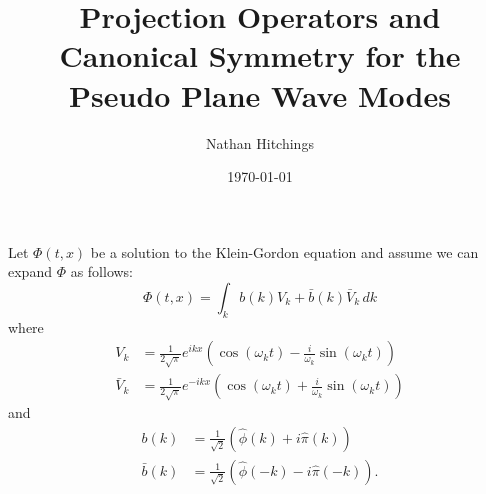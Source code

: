 \documentclass[12pt,oneside]{article}
\title{Projection Operators and Canonical Symmetry for the Pseudo Plane Wave Modes}
\date{\today}
\author{Nathan Hitchings}
\begin{document}
\maketitle
Let $\Phi(t,x)$ be a solution to the Klein-Gordon equation and assume
we can expand $\Phi$ as follows:
\begin{equation}
  \Phi(t,x)=\int_kb(k)V_k+\bar{b}(k)\bar{V}_k\, dk
\end{equation}
where 
\begin{align}
  V_k&=\frac{1}{2\sqrt{\pi}}e^{ikx}\left(\cos(\omega_{k}t)-\frac{i}{\omega_{k}}\sin(\omega_{k}t)\right)\\
  \bar{V}_k&=\frac{1}{2\sqrt{\pi}}e^{-ikx}\left(\cos(\omega_{k}t)+\frac{i}{\omega_{k}}\sin(\omega_{k}t)\right)
\end{align}
and 
\begin{align}
  b(k)&=\frac{1}{\sqrt{2}}\left(\hat{\phi}(k)+i\hat{\pi}(k)\right)\\
  \bar{b}(k)&=\frac{1}{\sqrt{2}}\left(\hat{\phi}(-k)-i\hat{\pi}(-k)\right).
\end{align}
\end{document}
